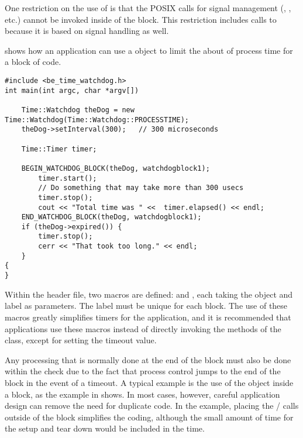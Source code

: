 One restriction on the use of  is that the POSIX calls for
signal management (, , etc.) cannot be
invoked inside of the  block. This restriction includes calls to
 because it is based on signal handling as well.

 shows how an application can use a 
object to limit the about of process time for a block of code.

\begin{lstlisting}[caption={Using the \class{Watchdog}}, label=watchdoguse]
#include <be_time_watchdog.h>
int main(int argc, char *argv[])

    Time::Watchdog theDog = new Time::Watchdog(Time::Watchdog::PROCESSTIME);
    theDog->setInterval(300);	// 300 microseconds

    Time::Timer timer;

    BEGIN_WATCHDOG_BLOCK(theDog, watchdogblock1);
        timer.start();
        // Do something that may take more than 300 usecs
        timer.stop();
        cout << "Total time was " <<  timer.elapsed() << endl;
    END_WATCHDOG_BLOCK(theDog, watchdogblock1);
    if (theDog->expired()) {
        timer.stop();
        cerr << "That took too long." << endl;
    }
{
}
\end{lstlisting}

Within the  header file, two macros are defined:
 and , each taking
the  object and label as parameters. The label must be unique
for each  block.  The use of these macros greatly simplifies
 timers for the application, and it is recommended that applications
use these macros instead of directly invoking the methods of the
 class, except for setting the timeout value.

Any processing that is normally done at the end of the  block must also
be done within the  check
due to the fact that process control jumps to the end of the  block
in the event of a timeout.
A typical example is the use of the 
object inside a  block, as the example in 
shows. In most cases, however, careful application design can remove the need
for duplicate code. In the example, placing the  / calls
outside of the  block simplifies the coding, although the small amount
of time for the  setup and tear down would be included in the time.
